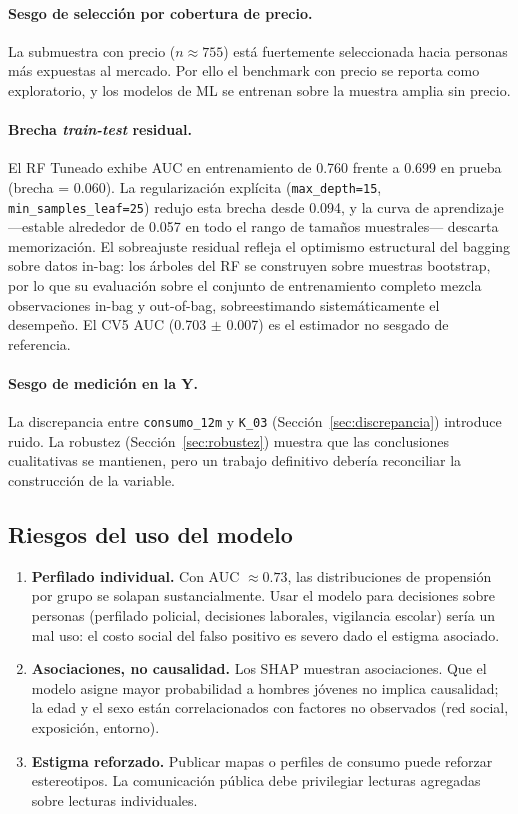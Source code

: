 \documentclass[12pt, a4paper]{article}
\begin{document}
\paragraph{Sesgo de selección por cobertura de precio.} La submuestra con precio (\(n\approx755\)) está fuertemente seleccionada hacia personas más expuestas al mercado. Por ello el benchmark con precio se reporta como exploratorio, y los modelos de ML se entrenan sobre la muestra amplia sin precio.

\paragraph{Brecha \textit{train-test} residual.} El RF Tuneado exhibe AUC en entrenamiento de 0.760 frente a 0.699 en prueba (brecha = 0.060). La regularización explícita (\texttt{max\_depth=15}, \texttt{min\_samples\_leaf=25}) redujo esta brecha desde 0.094, y la curva de aprendizaje —estable alrededor de 0.057 en todo el rango de tamaños muestrales— descarta memorización. El sobreajuste residual refleja el optimismo estructural del bagging sobre datos in-bag: los árboles del RF se construyen sobre muestras bootstrap, por lo que su evaluación sobre el conjunto de entrenamiento completo mezcla observaciones in-bag y out-of-bag, sobreestimando sistemáticamente el desempeño. El CV5 AUC (0.703 $\pm$ 0.007) es el estimador no sesgado de referencia.

\paragraph{Sesgo de medición en la Y.} La discrepancia entre \texttt{consumo\_12m} y \texttt{K\_03} (Sección~\ref{sec:discrepancia}) introduce ruido. La robustez (Sección~\ref{sec:robustez}) muestra que las conclusiones cualitativas se mantienen, pero un trabajo definitivo debería reconciliar la construcción de la variable.

\subsection{Riesgos del uso del modelo}

\begin{enumerate}
    \item \textbf{Perfilado individual.} Con AUC \(\approx 0.73\), las distribuciones de propensión por grupo se solapan sustancialmente. Usar el modelo para decisiones sobre personas (perfilado policial, decisiones laborales, vigilancia escolar) sería un mal uso: el costo social del falso positivo es severo dado el estigma asociado.
    \item \textbf{Asociaciones, no causalidad.} Los SHAP muestran asociaciones. Que el modelo asigne mayor probabilidad a hombres jóvenes no implica causalidad; la edad y el sexo están correlacionados con factores no observados (red social, exposición, entorno).
    \item \textbf{Estigma reforzado.} Publicar mapas o perfiles de consumo puede reforzar estereotipos. La comunicación pública debe privilegiar lecturas agregadas sobre lecturas individuales.
\end{enumerate}
\end{document}
